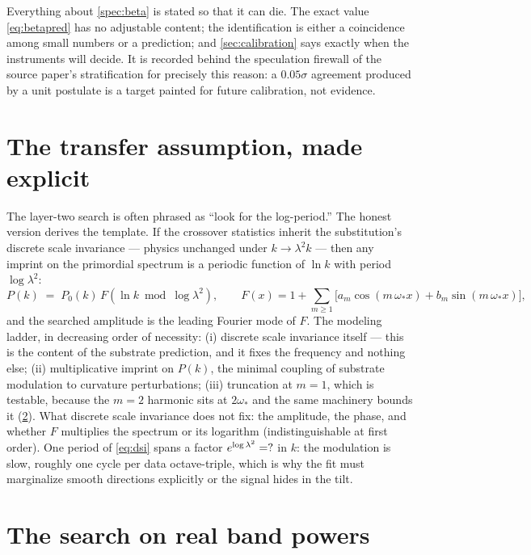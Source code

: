\documentclass[11pt,a4paper]{article}
\newcommand{\lam}{\lambda}
\theoremstyle{plain}
\theoremstyle{definition}
\begin{document}
Everything about \cref{spec:beta} is stated so that it can die. The
exact value \cref{eq:betapred} has no adjustable content; the
identification is either a coincidence among small numbers or a
prediction; and \cref{sec:calibration} says exactly when the
instruments will decide. 
It is recorded behind the speculation firewall of the source paper's
stratification for precisely this reason: a $0.05\sigma$ agreement
produced by a unit postulate is a target painted for future
calibration, not evidence.

\section{The transfer assumption, made explicit}
\label{sec:transfer}

The layer-two search is often phrased as ``look for the log-period.''
The honest version derives the template. If the crossover statistics
inherit the substitution's discrete scale invariance --- physics
unchanged under $k\to\lam^{2}k$ --- then any imprint on the primordial
spectrum is a periodic function of $\ln k$ with period $\log\lam^{2}$:
\begin{equation}
P(k)\;=\;P_{0}(k)\,
F\!\left(\ln k \bmod \log\lam^{2}\right),
\qquad
F(x)=1+\sum_{m\ge1}\bigl[a_{m}\cos(m\,\omega_{*}x)
+b_{m}\sin(m\,\omega_{*}x)\bigr],
\label{eq:dsi}
\end{equation}
and the searched amplitude is the leading Fourier mode of $F$. The
modeling ladder, in decreasing order of necessity: (i) discrete scale
invariance itself --- this is the content of the substrate prediction,
and it fixes the frequency and nothing else; (ii) multiplicative
imprint on $P(k)$, the minimal coupling of substrate modulation to
curvature perturbations; (iii) truncation at $m=1$, which is testable,
because the $m=2$ harmonic sits at $2\omega_{*}$ and the same machinery
bounds it (\cref{sec:search}). What discrete scale invariance does not
fix: the amplitude, the phase, and whether $F$ multiplies the spectrum
or its logarithm (indistinguishable at first order). One period of
\cref{eq:dsi} spans a factor $e^{\log\lam^{2}}=\CFPeriodFactor$ in $k$:
the modulation is slow, roughly one cycle per data octave-triple, which
is why the fit must marginalize smooth directions explicitly or the
signal hides in the tilt.

\section{The search on real band powers}
\label{sec:search}
\end{document}

